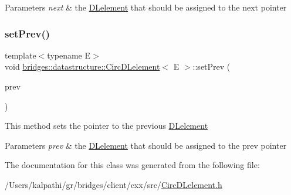 \begin{DoxyParams}{Parameters}
{\em next} & the \mbox{\hyperlink{classbridges_1_1datastructure_1_1_d_lelement}{D\+Lelement}} that should be assigned to the next pointer \\
\hline
\end{DoxyParams}
\mbox{\label{classbridges_1_1datastructure_1_1_circ_d_lelement_ac47b0221a0eebc3c539eec1700f2c776}} 
\subsubsection{\texorpdfstring{set\+Prev()}{setPrev()}}
{\footnotesize\ttfamily template$<$typename E$>$ \\
void \mbox{\hyperlink{classbridges_1_1datastructure_1_1_circ_d_lelement}{bridges\+::datastructure\+::\+Circ\+D\+Lelement}}$<$ E $>$\+::set\+Prev (\begin{DoxyParamCaption}\item[{\mbox{\hyperlink{classbridges_1_1datastructure_1_1_circ_d_lelement}{Circ\+D\+Lelement}}$<$ E $>$ $\ast$}]{prev }\end{DoxyParamCaption})\hspace{0.3cm}{\ttfamily [inline]}}

This method sets the pointer to the previous \mbox{\hyperlink{classbridges_1_1datastructure_1_1_d_lelement}{D\+Lelement}} 
\begin{DoxyParams}{Parameters}
{\em prev} & the \mbox{\hyperlink{classbridges_1_1datastructure_1_1_d_lelement}{D\+Lelement}} that should be assigned to the prev pointer \\
\hline
\end{DoxyParams}


The documentation for this class was generated from the following file\+:\begin{DoxyCompactItemize}
\item 
/\+Users/kalpathi/gr/bridges/client/cxx/src/\mbox{\hyperlink{_circ_d_lelement_8h}{Circ\+D\+Lelement.\+h}}\end{DoxyCompactItemize}
